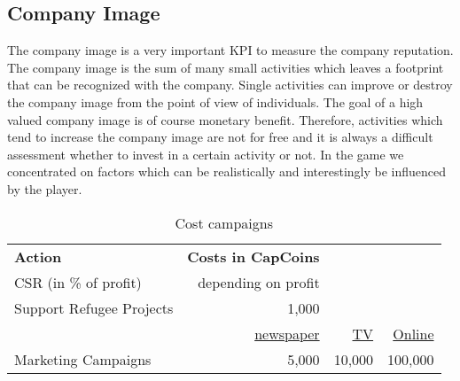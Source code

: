 \subsection{Company Image} \label{company_image}

The company image is a very important KPI to measure the company reputation. The company image is the sum of many small activities which leaves a footprint that can be recognized with the company. Single activities can improve or destroy the company image from the point of view of individuals. The goal of a high valued company image is of course monetary benefit. Therefore, activities which tend to increase the company image are not for free and it is always a difficult assessment whether to invest in a certain activity or not. In the game we concentrated on factors which can be realistically and interestingly be influenced by the player.

\begin{table}[]
\centering
\begin{tabular}{|l|r|r|r|}
\hline
\multicolumn{1}{|l|}{\textbf{Action}} & \multicolumn{1}{l}{\textbf{Costs in CapCoins}} & \multicolumn{1}{l}{} & \multicolumn{1}{l|}{} \\
CSR (in \% of profit)     & depending on profit &                   & \\
Support Refugee Projects  & 1,000        &                   & \\
  & \underline{newspaper} & \underline{TV}      &  \underline{Online} \\
Marketing Campaigns       & 5,000                & 10,000             & 100,000 \\
\hline
\end{tabular}
\caption{Cost campaigns}
\label{cost_campaigns}
\end{table}

